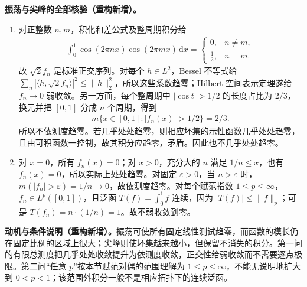 \documentclass[../../main.tex]{subfiles}
\begin{document}
\begin{solution}
\textbf{振荡与尖峰的全部核验（重构新增）。}
\begin{enumerate}
\item 对正整数 $n,m$，积化和差公式及整周期积分给
\begin{align*}
\int_0^1\cos(2\pi nx)\cos(2\pi mx)\,\mathrm dx
=\begin{cases}0,&n\ne m,\\ \frac12,&n=m.\end{cases}
\end{align*}
故 $\sqrt2f_n$ 是标准正交序列。对每个 $h\in L^2$，Bessel 不等式给 $\sum_n|\langle h,\sqrt2f_n\rangle|^2\leqslant\|h\|_2^2$，所以这些系数趋零；Hilbert 空间表示定理遂给 $f_n\to0$ 弱收敛。另一方面，每个整周期中 $|\cos t|>1/2$ 的长度占比为 $2/3$，换元并把 $[0,1]$ 分成 $n$ 个周期，得到
\begin{align*}
m\{x\in[0,1]:|f_n(x)|>1/2\}=2/3.
\end{align*}
所以不依测度趋零。若几乎处处趋零，则相应坏集的示性函数几乎处处趋零，且由可积函数一控制，故其积分应趋零，矛盾。因此也不几乎处处趋零。
\item 对 $x=0$，所有 $f_n(x)=0$；对 $x>0$，充分大的 $n$ 满足 $1/n\leqslant x$，也有 $f_n(x)=0$，所以实际上处处趋零。对固定 $\varepsilon>0$，当 $n>\varepsilon$ 时，$m(|f_n|>\varepsilon)=1/n\to0$，故依测度趋零。对每个赋范指数 $1\leqslant p\leqslant\infty$，$f_n\in L^p([0,1])$，且泛函 $T(f)=\int_0^1f$ 连续，因为 $|T(f)|\leqslant\|f\|_p$；可是 $T(f_n)=n\cdot(1/n)=1$。故不弱收敛到零。
\end{enumerate}
\end{solution}
\begin{remark}
\textbf{动机与条件说明（重构新增）。}振荡可使所有固定线性测试趋零，而函数的模长仍在固定比例的区域上很大；尖峰则使坏集越来越小，但保留不消失的积分。第一问的有限总测度把几乎处处收敛提升为依测度收敛，正交性给弱收敛而不需要逐点极限。第二问“任意 $p$”按本节赋范对偶的范围理解为 $1\leqslant p\leqslant\infty$，不能无说明地扩大到 $0<p<1$；该范围外积分一般不是相应拓扑下的连续泛函。
\end{remark}
\end{document}
